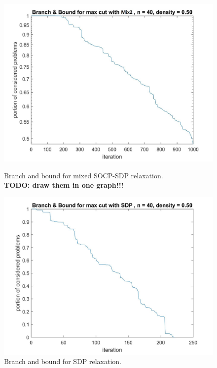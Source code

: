 \documentclass[12pt]{book}
\theoremstyle{definition}
\begin{document}
\begin{center}
\begin{figure}
\includegraphics[scale=1]{img/bnb_mix_n40_d50_2.jpg}
\caption[Branch and bound for mixed SOCP-SDP relaxation]{Branch and bound for mixed SOCP-SDP relaxation. \\ \textbf{TODO: draw them in one graph!!!}}

\includegraphics[scale=0.30]{img/bnb_sdp_n40_d50_2.jpg}
\caption[Branch and bound for SDP relaxation]{Branch and bound for SDP relaxation. }
\end{figure}
\end{center}
\end{document}
